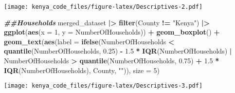 \documentclass[
]{article}
\newenvironment{Shaded}{\begin{snugshade}}{\end{snugshade}}
\newcommand{\AttributeTok}[1]{\textcolor[rgb]{0.13,0.29,0.53}{#1}}
\newcommand{\DecValTok}[1]{\textcolor[rgb]{0.00,0.00,0.81}{#1}}
\newcommand{\DocumentationTok}[1]{\textcolor[rgb]{0.56,0.35,0.01}{\textbf{\textit{#1}}}}
\newcommand{\FloatTok}[1]{\textcolor[rgb]{0.00,0.00,0.81}{#1}}
\newcommand{\FunctionTok}[1]{\textcolor[rgb]{0.13,0.29,0.53}{\textbf{#1}}}
\newcommand{\NormalTok}[1]{#1}
\newcommand{\SpecialCharTok}[1]{\textcolor[rgb]{0.81,0.36,0.00}{\textbf{#1}}}
\newcommand{\StringTok}[1]{\textcolor[rgb]{0.31,0.60,0.02}{#1}}
\begin{document}
\texttt{[image: kenya\_code\_files/figure-latex/Descriptives-2.pdf]}

\begin{Shaded}
\begin{Highlighting}[]
\DocumentationTok{\#\#Households}
\NormalTok{merged\_dataset }\SpecialCharTok{|\textgreater{}}
  \FunctionTok{filter}\NormalTok{(County }\SpecialCharTok{!=} \StringTok{"Kenya"}\NormalTok{) }\SpecialCharTok{|\textgreater{}} 
  \FunctionTok{ggplot}\NormalTok{(}\FunctionTok{aes}\NormalTok{(}\AttributeTok{x =} \DecValTok{1}\NormalTok{, }\AttributeTok{y =}\NormalTok{ NumberOfHouseholds)) }\SpecialCharTok{+}
  \FunctionTok{geom\_boxplot}\NormalTok{() }\SpecialCharTok{+}
  \FunctionTok{geom\_text}\NormalTok{(}\FunctionTok{aes}\NormalTok{(}\AttributeTok{label =} \FunctionTok{ifelse}\NormalTok{(NumberOfHouseholds }\SpecialCharTok{\textless{}} \FunctionTok{quantile}\NormalTok{(NumberOfHouseholds, }\FloatTok{0.25}\NormalTok{) }\SpecialCharTok{{-}} \FloatTok{1.5} \SpecialCharTok{*} \FunctionTok{IQR}\NormalTok{(NumberOfHouseholds) }\SpecialCharTok{|} 
\NormalTok{                                  NumberOfHouseholds }\SpecialCharTok{\textgreater{}} \FunctionTok{quantile}\NormalTok{(NumberOfHouseholds, }\FloatTok{0.75}\NormalTok{) }\SpecialCharTok{+} \FloatTok{1.5} \SpecialCharTok{*} \FunctionTok{IQR}\NormalTok{(NumberOfHouseholds), County, }\StringTok{""}\NormalTok{)),}
            \AttributeTok{size =} \DecValTok{5}\NormalTok{)}
\end{Highlighting}
\end{Shaded}

\texttt{[image: kenya\_code\_files/figure-latex/Descriptives-3.pdf]}
\end{document}
